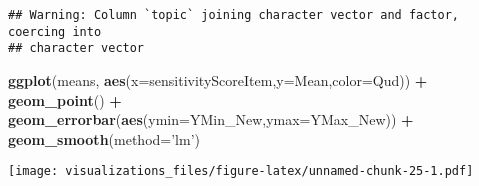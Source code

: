 \documentclass[]{article}
\newenvironment{Shaded}{\begin{snugshade}}{\end{snugshade}}
\newcommand{\KeywordTok}[1]{\textcolor[rgb]{0.13,0.29,0.53}{\textbf{#1}}}
\newcommand{\DataTypeTok}[1]{\textcolor[rgb]{0.13,0.29,0.53}{#1}}
\newcommand{\StringTok}[1]{\textcolor[rgb]{0.31,0.60,0.02}{#1}}
\newcommand{\OperatorTok}[1]{\textcolor[rgb]{0.81,0.36,0.00}{\textbf{#1}}}
\newcommand{\NormalTok}[1]{#1}
\begin{document}
\begin{Shaded}
\end{Shaded}

\begin{verbatim}
## Warning: Column `topic` joining character vector and factor, coercing into
## character vector
\end{verbatim}

\begin{Shaded}
\begin{Highlighting}[]
\KeywordTok{ggplot}\NormalTok{(means, }\KeywordTok{aes}\NormalTok{(}\DataTypeTok{x=}\NormalTok{sensitivityScoreItem,}\DataTypeTok{y=}\NormalTok{Mean,}\DataTypeTok{color=}\NormalTok{Qud)) }\OperatorTok{+}
\StringTok{  }\KeywordTok{geom_point}\NormalTok{() }\OperatorTok{+}
\StringTok{  }\KeywordTok{geom_errorbar}\NormalTok{(}\KeywordTok{aes}\NormalTok{(}\DataTypeTok{ymin=}\NormalTok{YMin_New,}\DataTypeTok{ymax=}\NormalTok{YMax_New)) }\OperatorTok{+}\StringTok{ }
\StringTok{  }\KeywordTok{geom_smooth}\NormalTok{(}\DataTypeTok{method=}\StringTok{'lm'}\NormalTok{)}
\end{Highlighting}
\end{Shaded}

\texttt{[image: visualizations\_files/figure-latex/unnamed-chunk-25-1.pdf]}
\end{document}
